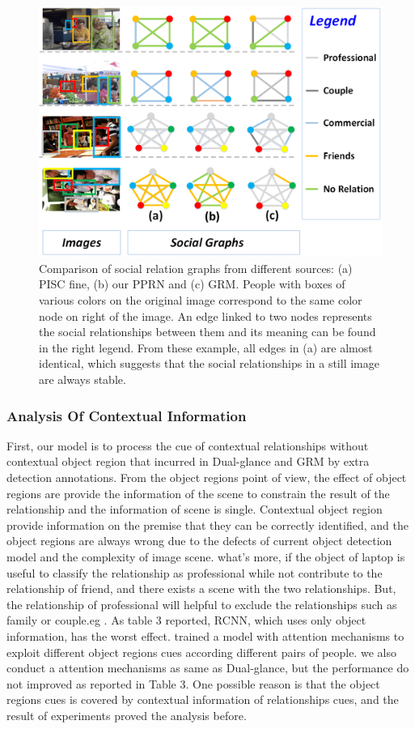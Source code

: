 \documentclass{article}
\newcommand{\PPRN}{{\sf PPRN}}
\begin{document}
\begin{figure}[ht]
  \centering
  \includegraphics[width=0.75\linewidth]{pic/case_study_pisc_fine_union_1.png}
  \caption{Comparison of social relation graphs from different sources: (a) PISC fine, (b) our {\PPRN}  and (c) GRM. People with boxes of various colors on the original image correspond to the same color node on right of the image. An edge linked to two nodes represents the social relationships between them and its meaning can be found in the right legend. From these example, all edges in (a) are almost identical, which suggests that the social relationships in a still image are always stable.}
  \label{fig:case_study}
\end{figure}

\subsubsection{Analysis Of Contextual Information}

First, our model is to process the cue of contextual relationships without contextual object region that incurred in Dual-glance and GRM by extra detection annotations.
From the object regions point of view, the effect of object regions are provide the information of the scene to constrain the result of the relationship and the information of scene is single. 
Contextual object region provide information on the premise that they can be correctly identified, and the object regions are always wrong due to the defects of current object detection model and the complexity of image scene.
what's more, if the object of laptop is useful to classify the relationship as professional while not contribute to the relationship of friend, and there exists a scene with the two relationships. But, the relationship of professional will helpful to exclude the relationships such as family or couple.eg .
As table 3 reported, RCNN, which uses only object information, has the worst effect. \cite{DBLP:conf/iccv/LiWZK17} trained a model with attention mechanisms to exploit different object regions cues according different pairs of people. we also conduct a attention mechanisms as same as Dual-glance, but the performance do not improved as reported in Table 3.
One possible reason is that the object regions cues is covered by contextual information of relationships cues, and the result of experiments proved the analysis before.
\end{document}
